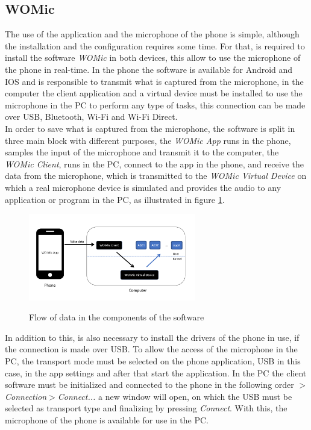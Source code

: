 \subsection*{WOMic}
The use of the application and the microphone of the phone is simple, although the installation and the configuration requires some time. For that, is required to install the software \textit{WOMic} in both devices, this allow to use the microphone of the phone in real-time. In the phone the software is available for Android and IOS and is responsible to transmit what is captured from the microphone, in the computer the client application and a virtual device must be installed to use the microphone in the PC to perform any type of tasks, this connection can be made over USB, Bluetooth, Wi-Fi and Wi-Fi Direct.\\ 
In order to save what is captured from the microphone, the software is split in three main block with different purposes, the \textit{WOMic App} runs in the phone, samples the input of the microphone and transmit it to the computer, the \textit{WOMic Client}, runs in the PC, connect to the app in the phone, and receive the data from the microphone, which is transmitted to the \textit{WOMic Virtual Device} on which a real microphone device is simulated and provides the audio to any application or program in the PC, as illustrated in figure \ref{fig:diagramWOMIC}.\\
\begin{figure}[]
    \centering
    \includegraphics[width=0.65\textwidth]{Chapters/5CHP/Images/WOMICDiag.png}
    \caption{Flow of data in the components of the software}{\cite{WOMicFREE}}
    \label{fig:diagramWOMIC}
\end{figure}
In addition to this, is also necessary to install the drivers of the phone in use, if the connection is made over USB. To allow the access of the microphone in the PC, the transport mode must be selected on the phone application, USB in this case, in the app settings and after that start the application. In the PC the client software must be initialized and connected to the phone in the following order \textit{$>$Connection$>$Connect...} a new window will open, on which the USB must be selected as transport type and finalizing by pressing \textit{Connect}. With this, the microphone of the phone is available for use in the PC\cite{WOMicFREE}.
